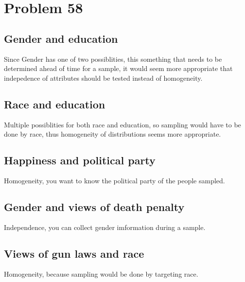 \documentclass{article}\usepackage[]{graphicx}\usepackage[]{color}
\begin{document}
\section*{Problem 58}
\subsection*{Gender and education}
Since Gender has one of two possiblities, this something that needs to be determined ahead of time for a sample, it would seem more appropriate that indepedence of attributes should be tested instead of homogeneity.
\subsection*{Race and education}
Multiple possiblities for both race and education, so sampling would have to be done by race, thus homogeneity of distributions seems more appropriate.
\subsection*{Happiness and political party}
Homogeneity, you want to know the political party of the people sampled.
\subsection*{Gender and views of death penalty}
Independence, you can collect gender imformation during a sample.
\subsection*{Views of gun laws and race}
Homogeneity, because sampling would be done by targeting race.
\end{document}

